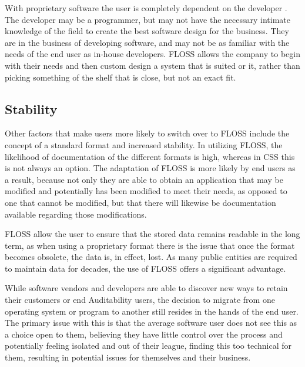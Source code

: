   With proprietary software the user is completely dependent on the developer . The developer may be a programmer, but may not have the necessary intimate knowledge of the field to create the best software design for the business. They are in the business of developing software, and may not be as familiar with the needs of the end user as in-house developers. FLOSS allows the company to begin with their needs and then custom design a system that is suited or it, rather than picking something of the shelf that is close, but not an exact fit. 

  \subsection {Stability} 

  Other factors that make users more likely to switch over to FLOSS include the concept of a standard format and increased stability. In utilizing FLOSS, the likelihood of documentation of the different formats is high, whereas in CSS  this is not always an option. The adaptation of FLOSS is more likely by end users as a result, because not only they are able to obtain an application that may be modified and potentially has been modified to meet their needs, as opposed to one that cannot be modified, but that there will likewise be documentation available regarding those modifications. 

  FLOSS allow the user to ensure that the stored data remains readable in the long term, as when using a proprietary format there is the issue that once the format becomes obsolete, the data is, in effect, lost. As many public entities are required to maintain data for decades, the use of FLOSS offers a significant advantage.

  While software vendors and developers are able to discover new ways to retain their customers or end Auditability users, the decision to migrate from one operating system or program to another still resides in the hands of the end user. The primary issue with this is that the average software user does not see this as a choice open to them, believing they have little control over the process and potentially feeling isolated and out of their league, finding this too technical for them, resulting in potential issues for themselves and their business.
 
